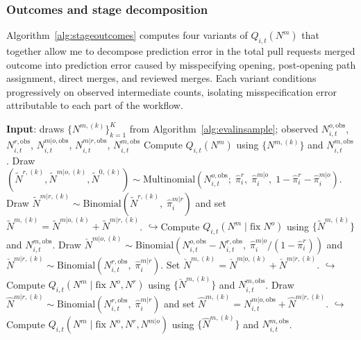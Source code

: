 \documentclass[source/paper/main.tex]{subfiles}
\begin{document}
\subsubsection{Outcomes and stage decomposition}

Algorithm~\ref{alg:stageoutcomes} computes four variants of $Q_{i,t}(N^m)$ that together allow me to decompose prediction error in the total pull requests merged outcome into prediction error caused by misspecifying opening, post-opening path assignment, direct merges, and reviewed merges.
Each variant conditions progressively on observed intermediate counts, isolating misspecification error attributable to each part of the workflow.

\begin{algorithm}[h]
\caption{StageOutcomes(org $i$, period $t$)}
\label{alg:stageoutcomes}
\begin{algorithmic}[1]
\Statex \textbf{Input}: draws $\{N^{m,(k)}\}_{k=1}^K$ from Algorithm~\ref{alg:evalinsample}; observed $N_{i,t}^{o,\mathrm{obs}}$, $N_{i,t}^{r,\mathrm{obs}}$, $N_{i,t}^{m|o,\mathrm{obs}}$, $N_{i,t}^{m|r,\mathrm{obs}}$, $N_{i,t}^{m,\mathrm{obs}}$
\State Compute $Q_{i,t}(N^m)$ using $\{N^{m,(k)}\}$ and $N_{i,t}^{m,\mathrm{obs}}$.
\State Draw $(\tilde{N}^{r,(k)},\tilde{N}^{m|o,(k)},\tilde{N}^{0,(k)}) \sim \mathrm{Multinomial}(N_{i,t}^{o,\mathrm{obs}};\;\hat{\pi}_i^r,\;\hat{\pi}_i^{m|o},\;1-\hat{\pi}_i^r-\hat{\pi}_i^{m|o})$.
\State Draw $\tilde{N}^{m|r,(k)} \sim \mathrm{Binomial}(\tilde{N}^{r,(k)},\;\hat{\pi}_i^{m|r})$ and set $\tilde{N}^{m,(k)}=\tilde{N}^{m|o,(k)}+\tilde{N}^{m|r,(k)}$.
\Statex \hspace{1.5em}$\hookrightarrow$\;Compute $Q_{i,t}(N^m \mid \mathrm{fix}\;N^o)$ using $\{\tilde{N}^{m,(k)}\}$ and $N_{i,t}^{m,\mathrm{obs}}$.
\State Draw $\check{N}^{m|o,(k)} \sim \mathrm{Binomial}(N_{i,t}^{o,\mathrm{obs}}-N_{i,t}^{r,\mathrm{obs}},\;\hat{\pi}_i^{m|o}/(1-\hat{\pi}_i^r))$ and $\check{N}^{m|r,(k)} \sim \mathrm{Binomial}(N_{i,t}^{r,\mathrm{obs}},\;\hat{\pi}_i^{m|r})$.
\State Set $\check{N}^{m,(k)}=\check{N}^{m|o,(k)}+\check{N}^{m|r,(k)}$.
\Statex \hspace{1.5em}$\hookrightarrow$\;Compute $Q_{i,t}(N^m \mid \mathrm{fix}\;N^o,N^r)$ using $\{\check{N}^{m,(k)}\}$ and $N_{i,t}^{m,\mathrm{obs}}$.
\State Draw $\hat{N}^{m|r,(k)} \sim \mathrm{Binomial}(N_{i,t}^{r,\mathrm{obs}},\;\hat{\pi}_i^{m|r})$ and set $\hat{N}^{m,(k)}=N_{i,t}^{m|o,\mathrm{obs}}+\hat{N}^{m|r,(k)}$.
\Statex \hspace{1.5em}$\hookrightarrow$\;Compute $Q_{i,t}(N^m \mid \mathrm{fix}\;N^o,N^r,N^{m|o})$ using $\{\hat{N}^{m,(k)}\}$ and $N_{i,t}^{m,\mathrm{obs}}$.
\end{algorithmic}
\end{algorithm}
\end{document}
